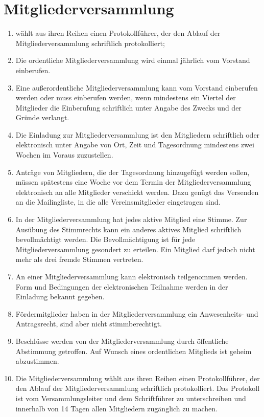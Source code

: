 \documentclass[ngerman]{article}
\begin{document}
\section{Mitgliederversammlung}
\begin{enumerate}
\item wählt aus ihren Reihen einen Protokollführer, der den Ablauf der Mitgliederversammlung schriftlich protokolliert;

  \item Die ordentliche Mitgliederversammlung wird einmal jährlich vom Vorstand einberufen.
  \item Eine außerordentliche Mitgliederversammlung kann vom Vorstand einberufen werden oder muss einberufen werden, wenn mindestens ein Viertel der Mitglieder die Einberufung schriftlich unter Angabe des Zwecks und der Gründe verlangt.
  \item Die Einladung zur Mitgliederversammlung ist den Mitgliedern schriftlich oder elektronisch unter Angabe von Ort, Zeit und Tagesordnung mindestens zwei Wochen im Voraus zuzustellen.
  \item Anträge von Mitgliedern, die der Tagesordnung hinzugefügt werden sollen, müssen spätestens eine Woche vor dem Termin der Mitgliederversammlung elektronisch an alle Mitglieder verschickt werden. Dazu genügt das Versenden an die Mailingliste, in die alle Vereinsmitglieder eingetragen sind.
  \item In der Mitgliederversammlung hat jedes aktive Mitglied eine Stimme. Zur Ausübung des Stimmrechts kann ein anderes aktives Mitglied schriftlich bevollmächtigt werden. Die Bevollmächtigung ist für jede Mitgliederversammlung gesondert zu erteilen. Ein Mitglied darf jedoch nicht mehr als drei fremde Stimmen vertreten.
  \item An einer Mitgliederversammlung kann elektronisch teilgenommen werden. Form und Bedingungen der elektronischen Teilnahme werden in der Einladung bekannt gegeben.
  \item Fördermitglieder haben in der Mitgliederversammlung ein Anwesenheits- und Antragsrecht, sind aber nicht stimmberechtigt.
  \item Beschlüsse werden von der Mitgliederversammlung durch öffentliche Abstimmung getroffen. Auf Wunsch eines ordentlichen Mitglieds ist geheim abzustimmen.
  \item Die Mitgliederversammlung wählt aus ihren Reihen einen Protokollführer, der den Ablauf der Mitgliederversammlung schriftlich protokolliert. Das Protokoll ist vom Versammlungsleiter und dem Schriftführer zu unterschreiben  und innerhalb von 14 Tagen allen Mitgliedern zugänglich zu machen.
\end{enumerate}
\end{document}
